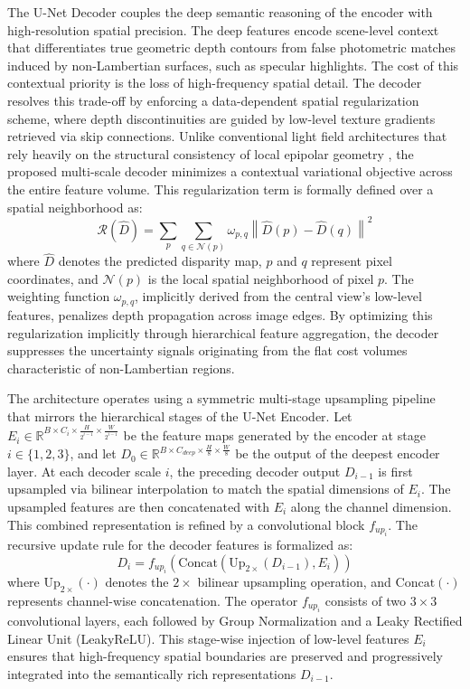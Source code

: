 \documentclass[lettersize,journal]{IEEEtran}
\begin{document}
The U-Net Decoder couples the deep semantic reasoning of the encoder with high-resolution spatial precision. The deep features encode scene-level context that differentiates true geometric depth contours from false photometric matches induced by non-Lambertian surfaces, such as specular highlights. The cost of this contextual priority is the loss of high-frequency spatial detail. The decoder resolves this trade-off by enforcing a data-dependent spatial regularization scheme, where depth discontinuities are guided by low-level texture gradients retrieved via skip connections. Unlike conventional light field architectures that rely heavily on the structural consistency of local epipolar geometry \cite{heber2018}, the proposed multi-scale decoder minimizes a contextual variational objective across the entire feature volume. This regularization term is formally defined over a spatial neighborhood as:
\begin{equation}
\mathcal{R}(\hat{D}) = \sum_{p} \sum_{q \in \mathcal{N}(p)} \omega_{p,q} \left\| \hat{D}(p) - \hat{D}(q) \right\|^2
\end{equation}
where $\hat{D}$ denotes the predicted disparity map, $p$ and $q$ represent pixel coordinates, and $\mathcal{N}(p)$ is the local spatial neighborhood of pixel $p$. The weighting function $\omega_{p,q}$, implicitly derived from the central view's low-level features, penalizes depth propagation across image edges. By optimizing this regularization implicitly through hierarchical feature aggregation, the decoder suppresses the uncertainty signals originating from the flat cost volumes characteristic of non-Lambertian regions.

The architecture operates using a symmetric multi-stage upsampling pipeline that mirrors the hierarchical stages of the U-Net Encoder. Let $E_i \in \mathbb{R}^{B \times C_i \times \frac{H}{2^{i-1}} \times \frac{W}{2^{i-1}}}$ be the feature maps generated by the encoder at stage $i \in \{1, 2, 3\}$, and let $D_0 \in \mathbb{R}^{B \times C_{deep} \times \frac{H}{8} \times \frac{W}{8}}$ be the output of the deepest encoder layer. At each decoder scale $i$, the preceding decoder output $D_{i-1}$ is first upsampled via bilinear interpolation to match the spatial dimensions of $E_i$. The upsampled features are then concatenated with $E_i$ along the channel dimension. This combined representation is refined by a convolutional block $f_{up_i}$. The recursive update rule for the decoder features is formalized as:
\begin{equation}
D_i = f_{up_i} \left( \text{Concat} \left( \text{Up}_{2\times}(D_{i-1}), E_i \right) \right)
\end{equation}
where $\text{Up}_{2\times}(\cdot)$ denotes the $2\times$ bilinear upsampling operation, and $\text{Concat}(\cdot)$ represents channel-wise concatenation. The operator $f_{up_i}$ consists of two $3 \times 3$ convolutional layers, each followed by Group Normalization and a Leaky Rectified Linear Unit (LeakyReLU). This stage-wise injection of low-level features $E_i$ ensures that high-frequency spatial boundaries are preserved and progressively integrated into the semantically rich representations $D_{i-1}$.
\end{document}
